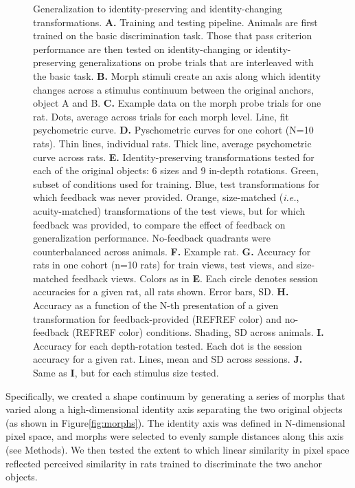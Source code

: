 \begin{figure}[t!]
    \caption[Generalization of visual behavior]{Generalization to identity-preserving and identity-changing transformations. \textbf{A.} Training and testing pipeline. Animals are first trained on the basic discrimination task. Those that pass criterion performance are then tested on identity-changing or identity-preserving generalizations on probe trials that are interleaved with the basic task. \textbf{B.} Morph stimuli create an axis along which identity changes across a stimulus continuum between the original anchors, object A and B. \textbf{C.} Example data on the morph probe trials for one rat. Dots, average across trials for each morph level. Line, fit psychometric curve. \textbf{D.} Pyschometric curves for one cohort (N=10 rats). Thin lines, individual rats. Thick line, average psychometric curve across rats. \textbf{E.} Identity-preserving transformations tested for each of the original objects: 6 sizes and 9 in-depth rotations. Green, subset of conditions used for training. Blue, test transformations for which feedback was never provided. Orange, size-matched (\textit{i.e.}, acuity-matched) transformations of the test views, but for which feedback was provided, to compare the effect of feedback on generalization performance. No-feedback quadrants were counterbalanced across animals. \textbf{F.} Example rat. \textbf{G.} Accuracy for rats in one cohort (n=10 rats) for train views, test views, and size-matched feedback views. Colors as in \textbf{E}. Each circle denotes session accuracies for a given rat, all rats shown. Error bars, SD. \textbf{H.} Accuracy as a function of the N-th presentation of a given transformation for feedback-provided (REFREF color) and no-feedback (REFREF color) conditions. Shading, SD across animals. \textbf{I.} Accuracy for each depth-rotation tested. Each dot is the session accuracy for a given rat. Lines, mean and SD across sessions. \textbf{J.} Same as \textbf{I}, but for each stimulus size tested. 
    \label{fig:behavior_generalization}}
\end{figure}





Specifically, we created a shape continuum by generating a series of morphs that varied along a high-dimensional identity axis separating the two original objects (as shown in Figure\ref{fig:morphs}). The identity axis was defined in N-dimensional pixel space, and morphs were selected to evenly sample distances along this axis (see Methods). We then tested the extent to which linear similarity in pixel space reflected perceived similarity in rats trained to discriminate the two anchor objects. 

